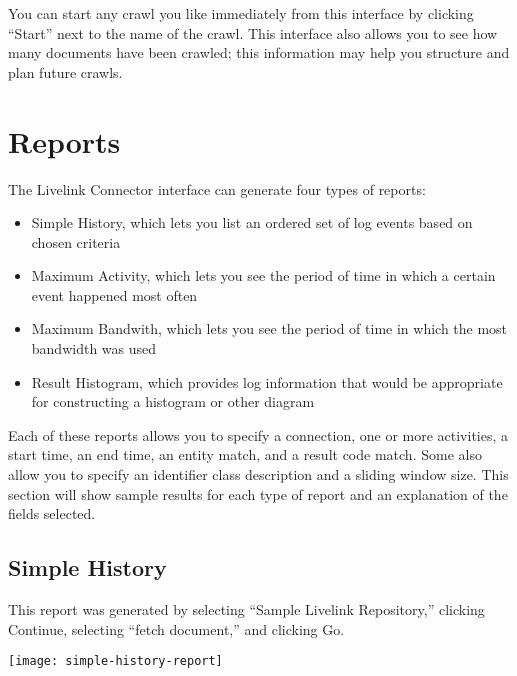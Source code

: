 \begin{changemargin}{1.5in}{0in}
You can start any crawl you like immediately from this interface by
clicking ``Start'' next to the name of the crawl. This interface also
allows you to see how many documents have been crawled; this information
may help you structure and plan future crawls.


\section{Reports}

The Livelink Connector interface can generate four types of reports:

\begin{itemize}

\item Simple History, which lets you list an ordered set of log events
based on chosen criteria

\item Maximum Activity, which lets you see the period of time in
which a certain event happened most often

\item Maximum Bandwith, which lets you see the period of time in
which the most bandwidth was used 

\item Result Histogram, which provides log information that would be
appropriate for constructing a histogram or other diagram

\end{itemize}

Each of these reports allows you to specify a connection, one or more
activities, a start time, an end time, an entity match, and a result code
match.  Some also allow you to specify an identifier class description
and a sliding window size. This section will show sample results for
each type of report and an explanation of the fields selected.

\subsection{Simple History}

This report was generated by selecting ``Sample Livelink Repository,'' 
clicking Continue, selecting ``fetch document,'' and clicking Go.

\texttt{[image: simple-history-report]}


\end{changemargin}
